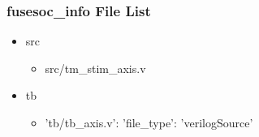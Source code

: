\subsubsection{fusesoc\_info File List}
\begin{itemize}
\item src
	\begin{itemize}
	\item src/tm\_stim\_axis.v
	\end{itemize}
\item tb
	\begin{itemize}
	\item {'tb/tb\_axis.v': {'file\_type': 'verilogSource'}}
	\end{itemize}
\end{itemize}

